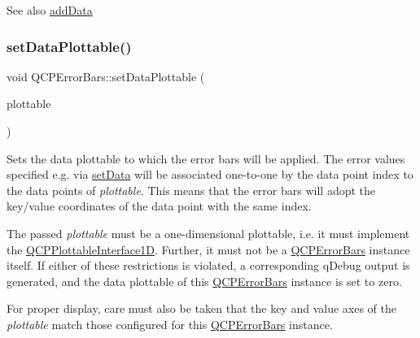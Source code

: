 \begin{DoxySeeAlso}{See also}
\hyperlink{class_q_c_p_error_bars_aae296ad9817b3fa418db284af81cecf8}{add\+Data} 
\end{DoxySeeAlso}
\mbox{\label{class_q_c_p_error_bars_aabb42a964cfbf780cd1c79850c7cd989}} 
\subsubsection{\texorpdfstring{set\+Data\+Plottable()}{setDataPlottable()}}
{\footnotesize\ttfamily void Q\+C\+P\+Error\+Bars\+::set\+Data\+Plottable (\begin{DoxyParamCaption}\item[{\hyperlink{class_q_c_p_abstract_plottable}{Q\+C\+P\+Abstract\+Plottable} $\ast$}]{plottable }\end{DoxyParamCaption})}

Sets the data plottable to which the error bars will be applied. The error values specified e.\+g. via \hyperlink{class_q_c_p_error_bars_a92b1980003255f5f7c05407a4d92aabc}{set\+Data} will be associated one-\/to-\/one by the data point index to the data points of {\itshape plottable}. This means that the error bars will adopt the key/value coordinates of the data point with the same index.

The passed {\itshape plottable} must be a one-\/dimensional plottable, i.\+e. it must implement the \hyperlink{class_q_c_p_plottable_interface1_d}{Q\+C\+P\+Plottable\+Interface1D}. Further, it must not be a \hyperlink{class_q_c_p_error_bars}{Q\+C\+P\+Error\+Bars} instance itself. If either of these restrictions is violated, a corresponding q\+Debug output is generated, and the data plottable of this \hyperlink{class_q_c_p_error_bars}{Q\+C\+P\+Error\+Bars} instance is set to zero.

For proper display, care must also be taken that the key and value axes of the {\itshape plottable} match those configured for this \hyperlink{class_q_c_p_error_bars}{Q\+C\+P\+Error\+Bars} instance. \mbox{\label{class_q_c_p_error_bars_af0af493d454a8f3a0908830160680d2b}} 
